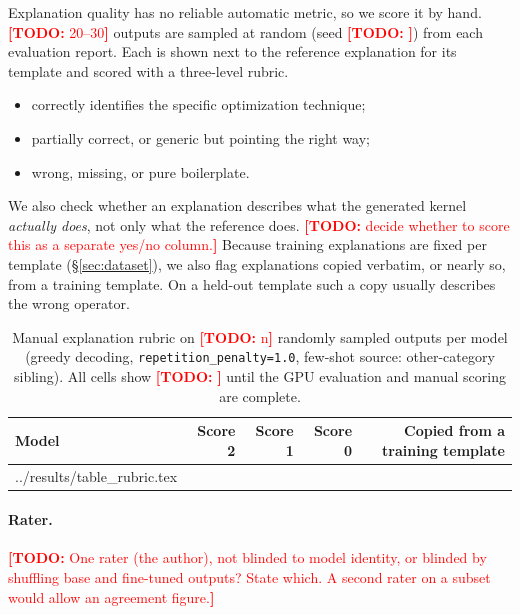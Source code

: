 \documentclass[11pt]{article}
\makeatletter
\newcommand{\todo}[1]{\textcolor{red}{\textbf{[TODO:} #1\textbf{]}}}
\newcommand{\resultsdir}{../results}
\newif\ifhaverubric     \IfFileExists{\resultsdir/table_rubric.tex}{\haverubrictrue}{}
\newcommand{\resultrows}[1]{\@@input \resultsdir/table_#1.tex }
\makeatother
\begin{document}
Explanation quality has no reliable automatic metric, so we score it by hand.
\todo{20--30} outputs are sampled at random (seed \todo{}) from each evaluation report. Each
is shown next to the reference explanation for its template and scored with a three-level rubric.
\begin{itemize}
  \item[\textbf{2}] correctly identifies the specific optimization technique;
  \item[\textbf{1}] partially correct, or generic but pointing the right way;
  \item[\textbf{0}] wrong, missing, or pure boilerplate.
\end{itemize}
We also check whether an explanation describes what the generated kernel \emph{actually does}, not
only what the reference does. \todo{decide whether to score this as a separate yes/no column.}
Because training explanations are fixed per template (\S\ref{sec:dataset}), we also flag
explanations copied verbatim, or nearly so, from a training template. On a held-out template such a
copy usually describes the wrong operator.

\begin{table}[t]
\centering
\small
\begin{tabular}{@{}lrrrr@{}}
\toprule
Model & Score 2 & Score 1 & Score 0 & Copied from a training template \\
\midrule
\ifhaverubric \resultrows{rubric}\else
Base       & \todo{} & \todo{} & \todo{} & -- \\
Fine-tuned & \todo{} & \todo{} & \todo{} & \todo{} \\
\fi
\bottomrule
\end{tabular}
\caption{Manual explanation rubric on \todo{n} randomly sampled outputs per model
(greedy decoding, \texttt{repetition\_penalty=1.0}, few-shot source: other-category sibling).
All cells show \todo{} until the GPU evaluation and manual scoring are complete.}
\label{tab:rubric}
\end{table}

\paragraph{Rater.} \todo{One rater (the author), not blinded to model identity, or blinded by
shuffling base and fine-tuned outputs? State which. A second rater on a subset would allow an
agreement figure.}

\end{document}

